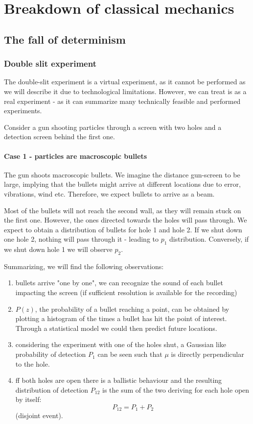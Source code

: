 \chapter{Breakdown of classical mechanics}

\section{The fall of determinism}

  \subsection{Double slit experiment}
  The double-slit experiment is a virtual experiment, as it cannot be performed as we will describe it due to technological limitations. However, we can treat is as a real experiment - as it can summarize many technically feasible and performed experiments.
  
 Consider a gun shooting particles through a screen with two holes and a detection screen behind the first one.
 
  \subsubsection{Case 1 - particles are macroscopic bullets}
  The gun shoots macroscopic bullets. We imagine the distance gun-screen to be large, implying that the bullets might arrive at different locations due to error, vibrations, wind etc. Therefore, we expect bullets to arrive as a beam.

  Most of the bullets will not reach the second wall, as they will remain stuck on the first one. However, the ones directed towards the holes will pass through. We expect to obtain a distribution of bullets for hole 1 and hole 2. If we shut down one hole 2, nothing will pass through it - leading to $p_1$ distribution. Conversely, if we shut down hole 1 we will observe $p_2$.
  
Summarizing, we will find the following observations:
\begin{enumerate}
    \item bullets arrive "one by one", we can recognize the sound of each bullet impacting the screen (if sufficient resolution is available for the recording)
    \item $P(z)$, the probability of a bullet reaching a point, can be obtained by plotting a histogram of the times a bullet has hit the point of interest. Through a statistical model we could then predict future locations. 
     \item considering the experiment with one of the holes shut, a Gaussian like probability of detection $P_1$ can be seen such that $\mu$ is directly perpendicular to the hole.
     \item ff both holes are open there is a ballistic behaviour and the resulting distribution of detection $P_{12}$ is the sum of the two deriving for each hole open by itself: $$P_{12} = P_1+P_2$$ (disjoint event).
\end{enumerate}
    
